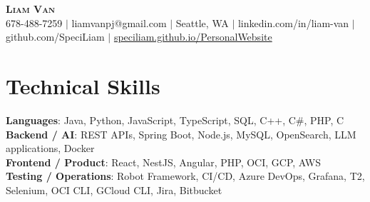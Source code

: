 \documentclass[letterpaper,11pt]{article}
\begin{document}

%
\begin{center}
    \textbf{\Huge \scshape Liam Van} \\ \vspace{1pt}
    \small 678-488-7259 $|$ \small {liamvanpj@gmail.com} $|$ Seattle, WA
 {{$|$ linkedin.com/in/liam-van} {$|$ github.com/SpeciLiam} {$|$ \href{https://speciliam.github.io/PersonalWebsite}{speciliam.github.io/PersonalWebsite}}}

\end{center}

\section{Technical Skills}
 \begin{itemize}[leftmargin=0.15in, label={}]
    \small{\item{
     \textbf{Languages}{: Java, Python, JavaScript, TypeScript, SQL, C++, C\#, PHP, C} \\
     \textbf{Backend / AI}{: REST APIs, Spring Boot, Node.js, MySQL, OpenSearch, LLM applications, Docker} \\
     \textbf{Frontend / Product}{: React, NestJS, Angular, PHP, OCI, GCP, AWS} \\
     \textbf{Testing / Operations}{: Robot Framework, CI/CD, Azure DevOps, Grafana, T2, Selenium, OCI CLI, GCloud CLI, Jira, Bitbucket} \\
    }}
 \end{itemize}
%
\end{document}
